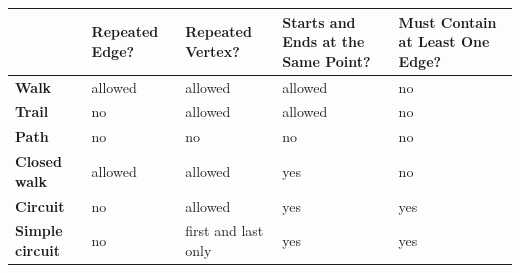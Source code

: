 \documentclass[../mathNotesPreamble]{subfiles}
\begin{document}
  \begin{center}
    \renewcommand{\arraystretch}{1.5}
    \begin{tabular}{@{}m{30mm}*{2}{M{25mm}}*{2}{M{47.5mm}}@{}}
      \toprule
      & \textbf{Repeated Edge?}& \textbf{Repeated Vertex?}& \textbf{Starts and Ends at the Same Point?}& \textbf{Must Contain at Least One Edge?}\\\midrule
      \textbf{Walk}& allowed& allowed& allowed& no\\
      \textbf{Trail}& no& allowed& allowed& no\\
      \textbf{Path}& no& no& no& no\\
      \textbf{Closed walk}& allowed& allowed& yes& no\\
      \textbf{Circuit}& no& allowed& yes& yes\\
      \textbf{Simple} \newline\textbf{circuit}& no& first and last only& yes& yes\\
      \bottomrule
    \end{tabular}
  \end{center}
\end{document}
